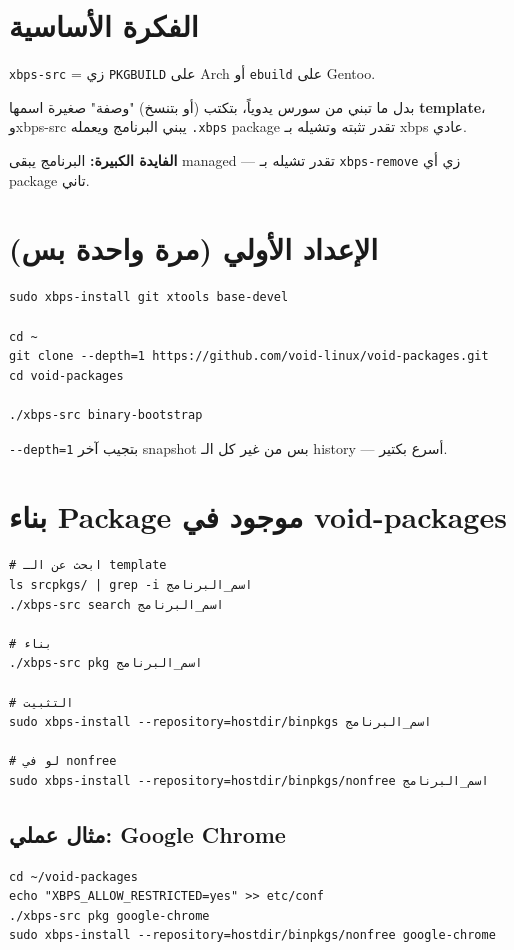 \documentclass[12pt, a4paper]{report}
\newcommand{\pkg}[1]{\texttt{\color{accent}#1}}
\begin{document}
\section{الفكرة الأساسية}

\pkg{xbps-src} = زي \texttt{PKGBUILD} على Arch أو \texttt{ebuild} على Gentoo.

بدل ما تبني من سورس يدوياً، بتكتب (أو بتنسخ) "وصفة" صغيرة اسمها \textbf{template}، وxbps-src يبني البرنامج ويعمله \texttt{.xbps} package تقدر تثبته وتشيله بـ xbps عادي.

\begin{tcolorbox}[notebox]
\textbf{الفايدة الكبيرة:} البرنامج يبقى managed --- تقدر تشيله بـ \texttt{xbps-remove} زي أي package تاني.
\end{tcolorbox}

\section{الإعداد الأولي (مرة واحدة بس)}

\begin{lstlisting}
sudo xbps-install git xtools base-devel

cd ~
git clone --depth=1 https://github.com/void-linux/void-packages.git
cd void-packages

./xbps-src binary-bootstrap
\end{lstlisting}

\begin{tcolorbox}[notebox]
\texttt{-{}-depth=1} بتجيب آخر snapshot بس من غير كل الـ history --- أسرع بكتير.
\end{tcolorbox}

\section{بناء Package موجود في void-packages}

\begin{lstlisting}
# ابحث عن الـ template
ls srcpkgs/ | grep -i اسم_البرنامج
./xbps-src search اسم_البرنامج

# بناء
./xbps-src pkg اسم_البرنامج

# التثبيت
sudo xbps-install --repository=hostdir/binpkgs اسم_البرنامج

# لو في nonfree
sudo xbps-install --repository=hostdir/binpkgs/nonfree اسم_البرنامج
\end{lstlisting}

\subsection{مثال عملي: Google Chrome}
\begin{lstlisting}
cd ~/void-packages
echo "XBPS_ALLOW_RESTRICTED=yes" >> etc/conf
./xbps-src pkg google-chrome
sudo xbps-install --repository=hostdir/binpkgs/nonfree google-chrome
\end{lstlisting}
\end{document}
